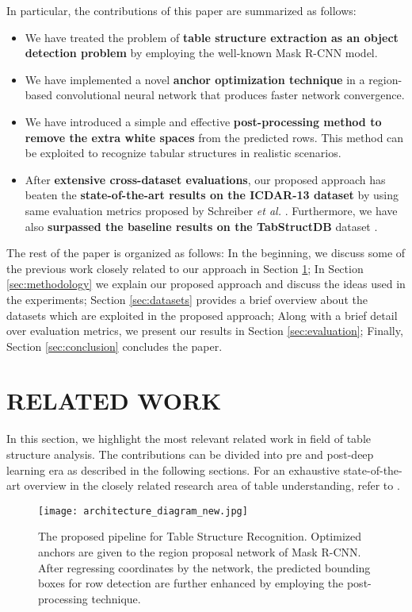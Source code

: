 \documentclass{ieeeaccess}
\begin{document}
In particular, the contributions of this paper are summarized as follows:
\begin{itemize}
\item We have treated the problem of \textbf{table structure extraction as an object detection problem} by employing the well-known Mask R-CNN model.
  \item We have implemented a novel \textbf{anchor optimization technique} in a region-based convolutional neural network that produces faster network convergence. 
  \item We have introduced a simple and effective \textbf{post-processing method to remove the extra white spaces} from the predicted rows. This method can be exploited to recognize tabular structures in realistic scenarios.
  \item After \textbf{extensive cross-dataset evaluations}, our proposed approach has beaten the \textbf{state-of-the-art results on the ICDAR-13 dataset} \cite{b18} by using same evaluation metrics proposed by Schreiber \textit{et al.} \cite{b27}. Furthermore, we have also \textbf{surpassed the baseline results on the TabStructDB} dataset \cite{b33}.
\end{itemize}


The rest of the paper is organized as follows: In the beginning, we discuss some of the previous work closely related to our approach in Section \ref{sec:related_work}; In Section \ref{sec:methodology} we explain our proposed approach and discuss the ideas used in the experiments; Section \ref{sec:datasets} provides a brief overview about the datasets which are exploited in the proposed approach; Along with a brief detail over evaluation metrics, we present our results in Section \ref{sec:evaluation}; Finally, Section \ref{sec:conclusion} concludes the paper.


\section{RELATED WORK}
\label{sec:related_work}

In this section, we highlight the most relevant related work in field of table structure analysis. The contributions can be divided into pre and post-deep learning era as described in the following sections. For an exhaustive state-of-the-art overview in the closely related research area of table understanding, refer to \cite{b1,b2,b3,b4,b5,b6,b7,b8,b9,b10}.




\begin{figure*}[ht]
    \texttt{[image: architecture\_diagram\_new.jpg]}
    \caption{The proposed pipeline for Table Structure Recognition. Optimized anchors are given to the region proposal network of Mask R-CNN. After regressing coordinates by the network, the predicted bounding boxes for row detection are further enhanced by employing the post-processing technique.}
    \label{fig:architecture_diagram}
\end{figure*}
\end{document}
